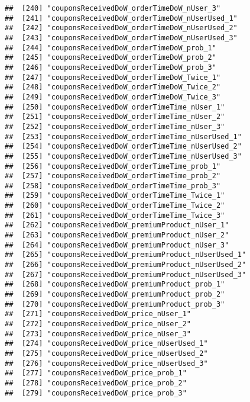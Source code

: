 \documentclass[10pt]{report}
\begin{document}
\begin{verbatim}
##  [240] "couponsReceivedDoW_orderTimeDoW_nUser_3"              
##  [241] "couponsReceivedDoW_orderTimeDoW_nUserUsed_1"          
##  [242] "couponsReceivedDoW_orderTimeDoW_nUserUsed_2"          
##  [243] "couponsReceivedDoW_orderTimeDoW_nUserUsed_3"          
##  [244] "couponsReceivedDoW_orderTimeDoW_prob_1"               
##  [245] "couponsReceivedDoW_orderTimeDoW_prob_2"               
##  [246] "couponsReceivedDoW_orderTimeDoW_prob_3"               
##  [247] "couponsReceivedDoW_orderTimeDoW_Twice_1"              
##  [248] "couponsReceivedDoW_orderTimeDoW_Twice_2"              
##  [249] "couponsReceivedDoW_orderTimeDoW_Twice_3"              
##  [250] "couponsReceivedDoW_orderTimeTime_nUser_1"             
##  [251] "couponsReceivedDoW_orderTimeTime_nUser_2"             
##  [252] "couponsReceivedDoW_orderTimeTime_nUser_3"             
##  [253] "couponsReceivedDoW_orderTimeTime_nUserUsed_1"         
##  [254] "couponsReceivedDoW_orderTimeTime_nUserUsed_2"         
##  [255] "couponsReceivedDoW_orderTimeTime_nUserUsed_3"         
##  [256] "couponsReceivedDoW_orderTimeTime_prob_1"              
##  [257] "couponsReceivedDoW_orderTimeTime_prob_2"              
##  [258] "couponsReceivedDoW_orderTimeTime_prob_3"              
##  [259] "couponsReceivedDoW_orderTimeTime_Twice_1"             
##  [260] "couponsReceivedDoW_orderTimeTime_Twice_2"             
##  [261] "couponsReceivedDoW_orderTimeTime_Twice_3"             
##  [262] "couponsReceivedDoW_premiumProduct_nUser_1"            
##  [263] "couponsReceivedDoW_premiumProduct_nUser_2"            
##  [264] "couponsReceivedDoW_premiumProduct_nUser_3"            
##  [265] "couponsReceivedDoW_premiumProduct_nUserUsed_1"        
##  [266] "couponsReceivedDoW_premiumProduct_nUserUsed_2"        
##  [267] "couponsReceivedDoW_premiumProduct_nUserUsed_3"        
##  [268] "couponsReceivedDoW_premiumProduct_prob_1"             
##  [269] "couponsReceivedDoW_premiumProduct_prob_2"             
##  [270] "couponsReceivedDoW_premiumProduct_prob_3"             
##  [271] "couponsReceivedDoW_price_nUser_1"                     
##  [272] "couponsReceivedDoW_price_nUser_2"                     
##  [273] "couponsReceivedDoW_price_nUser_3"                     
##  [274] "couponsReceivedDoW_price_nUserUsed_1"                 
##  [275] "couponsReceivedDoW_price_nUserUsed_2"                 
##  [276] "couponsReceivedDoW_price_nUserUsed_3"                 
##  [277] "couponsReceivedDoW_price_prob_1"                      
##  [278] "couponsReceivedDoW_price_prob_2"                      
##  [279] "couponsReceivedDoW_price_prob_3"                      

\end{verbatim}
\end{document}
